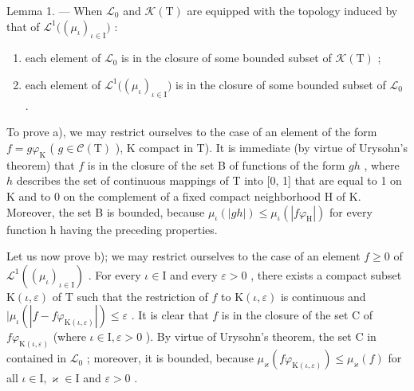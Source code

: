 Lemma 1. --- When \(\mathcal{L}_0\) and \(\mathcal{K}(\mathrm{T})\) are equipped with the topology induced by that of \(\mathcal{L}^1\big((\mu_\iota)_{\iota \in \mathrm{I}}\big)\) :

\begin{enumerate}
\def\labelenumi{\alph{enumi})}
\item
  each element of \(\mathcal{L}_0\) is in the closure of some bounded subset of \(\mathcal{K}(\mathrm{T})\) ;
\item
  each element of \(\mathcal{L}^1\big((\mu_\iota)_{\iota \in \mathrm{I}}\big)\) is in the closure of some bounded subset of \(\mathcal{L}_0\) .
\end{enumerate}

To prove a), we may restrict ourselves to the case of an element of the form \(f = g\varphi_{\mathrm{K}}\) ( \(g \in \mathcal{C}(\mathrm{T})\) ), K compact in T). It is immediate (by virtue of Urysohn's theorem) that \(f\) is in the closure of the set B of functions of the form \(gh\) , where \(h\) describes the set of continuous mappings of T into {[}0, 1{]} that are equal to 1 on K and to 0 on the complement of a fixed compact neighborhood H of K. Moreover, the set B is bounded, because \(\mu_{\iota}(|gh|) \leqslant \mu_{\iota}(|f\varphi_{\mathrm{H}}|)\) for every function h having the preceding properties.

Let us now prove b); we may restrict ourselves to the case of an element \(f \geqslant 0\) of \(\mathcal{L}^1((\mu_\iota)_{\iota \in \mathrm{I}})\) . For every \(\iota \in \mathrm{I}\) and every \(\varepsilon > 0\) , there exists a compact subset \(\mathrm{K}(\iota, \varepsilon)\) of \(\mathrm{T}\) such that the restriction of \(f\) to \(\mathrm{K}(\iota, \varepsilon)\) is continuous and \(|\mu_\iota(|f - f\varphi_{\mathrm{K}(\iota, \varepsilon)}|) \leqslant \varepsilon\) . It is clear that \(f\) is in the closure of the set \(\mathrm{C}\) of \(f\varphi_{\mathrm{K}(\iota, \varepsilon)}\) (where \(\iota \in \mathrm{I}, \varepsilon > 0\) ). By virtue of Urysohn's theorem, the set \(\mathrm{C}\) in contained in \(\mathcal{L}_0\) ; moreover, it is bounded, because \(\mu_\varkappa(f\varphi_{\mathrm{K}(\iota, \varepsilon)}) \leqslant \mu_\varkappa(f)\) for all \(\iota \in \mathrm{I}, \varkappa \in \mathrm{I}\) and \(\varepsilon > 0\) .

